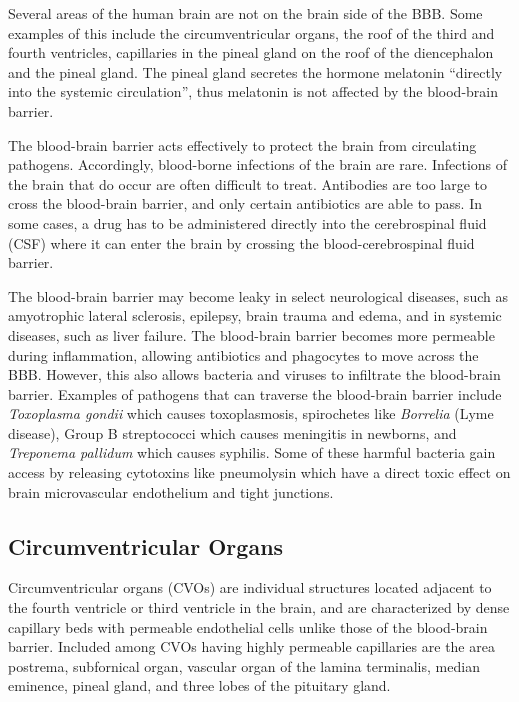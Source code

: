 Several areas of the human brain are not on the brain side of the BBB. Some examples of this include the circumventricular organs, the roof of the third and fourth ventricles, capillaries in the pineal gland on the roof of the diencephalon and the pineal gland. The pineal gland secretes the hormone melatonin ``directly into the systemic circulation'', thus melatonin is not affected by the blood-brain barrier.

The blood-brain barrier acts effectively to protect the brain from circulating pathogens. Accordingly, blood-borne infections of the brain are rare. Infections of the brain that do occur are often difficult to treat. Antibodies are too large to cross the blood-brain barrier, and only certain antibiotics are able to pass. In some cases, a drug has to be administered directly into the cerebrospinal fluid (CSF) where it can enter the brain by crossing the blood-cerebrospinal fluid barrier.

The blood-brain barrier may become leaky in select neurological diseases, such as amyotrophic lateral sclerosis, epilepsy, brain trauma and edema, and in systemic diseases, such as liver failure. The blood-brain barrier becomes more permeable during inflammation, allowing antibiotics and phagocytes to move across the BBB. However, this also allows bacteria and viruses to infiltrate the blood-brain barrier. Examples of pathogens that can traverse the blood-brain barrier include \emph{Toxoplasma gondii} which causes toxoplasmosis, spirochetes like \emph{Borrelia} (Lyme disease), Group B streptococci which causes meningitis in newborns, and \emph{Treponema pallidum} which causes syphilis. Some of these harmful bacteria gain access by releasing cytotoxins like pneumolysin which have a direct toxic effect on brain microvascular endothelium and tight junctions.

\hypertarget{circumventricular-organs}{%
\subsection{Circumventricular Organs}\label{circumventricular-organs}}

Circumventricular organs (CVOs) are individual structures located adjacent to the fourth ventricle or third ventricle in the brain, and are characterized by dense capillary beds with permeable endothelial cells unlike those of the blood-brain barrier. Included among CVOs having highly permeable capillaries are the area postrema, subfornical organ, vascular organ of the lamina terminalis, median eminence, pineal gland, and three lobes of the pituitary gland.


